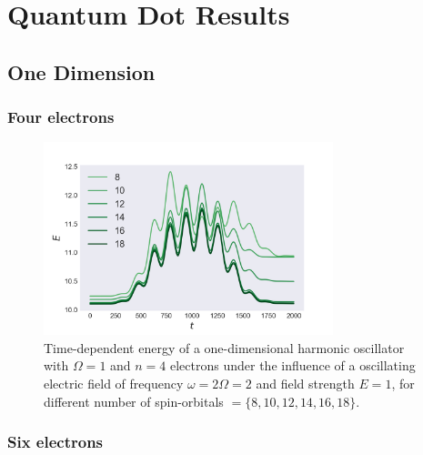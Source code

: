 \chapter{Quantum Dot Results}

\section{One Dimension}
\label{app:1d_qd}

\subsection*{Four electrons}

\begin{figure}[h]
    \centering
    \includegraphics[width=0.75\textwidth]{results/figures/1D/n=4energy.png} 
    \caption{Time-dependent energy of a one-dimensional harmonic oscillator with $\Omega=1$
        and $n=4$ electrons under the influence of a oscillating electric field 
        of frequency $\omega = 2 \Omega = 2$ and field strength $E=1$, for 
        different number of spin-orbitals $=\{8,10,12,14,16,18\}$.
    }
    \label{fig:1d_n4_qd}
\end{figure}

\pagebreak

\subsection*{Six electrons}

